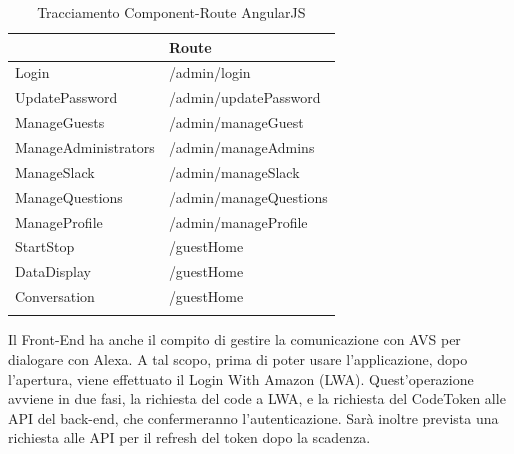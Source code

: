 \documentclass[../DefinizioneDiProdotto_v3.0.0.tex]{subfiles}
\begin{document}
\begin{longtable}[c] { >{\centering\arraybackslash}p{5cm} >{\centering\arraybackslash}p{5cm} }
	\toprule
	{\textbf{Componente}} & {\textbf{Route}}       \\
	\midrule
	Login                 & /admin/login           \\
	\addlinespace[0.3em]
	\midrule
	UpdatePassword        & /admin/updatePassword  \\
	\addlinespace[0.3em]
	\midrule
	ManageGuests          & /admin/manageGuest     \\
	\addlinespace[0.3em]
	\midrule
	ManageAdministrators  & /admin/manageAdmins    \\
	\addlinespace[0.3em]
	\midrule
	ManageSlack           & /admin/manageSlack     \\
	\addlinespace[0.3em]
	\midrule
	ManageQuestions       & /admin/manageQuestions \\
	\addlinespace[0.3em]
	\midrule
	ManageProfile         & /admin/manageProfile   \\
	\addlinespace[0.3em]
	\midrule
	StartStop             & /guestHome             \\
	\addlinespace[0.3em]
	\midrule
	DataDisplay           & /guestHome             \\
	\addlinespace[0.3em]
	\midrule
	Conversation          & /guestHome             \\
	\addlinespace[0.3em]
	\bottomrule
	\caption{Tracciamento Component-Route AngularJS}
\end{longtable}

\clearpage

Il Front-End ha anche il compito di gestire la comunicazione con AVS per dialogare con Alexa. A tal scopo, prima di poter usare l'applicazione, dopo l'apertura, viene effettuato il Login With Amazon (LWA). Quest'operazione avviene in due fasi, la richiesta del code a LWA, e la richiesta del CodeToken alle API del back-end, che confermeranno l'autenticazione. Sarà inoltre prevista una richiesta alle API per il refresh del token dopo la scadenza.
\end{document}
